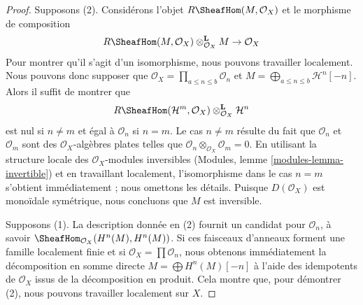 {\begin{proof}
Supposons (2). Considérons l'objet $R\SheafHom(M, \mathcal{O}_X)$
et le morphisme de composition
$$
R\SheafHom(M, \mathcal{O}_X) \otimes_{\mathcal{O}_X}^\mathbf{L} M \to
\mathcal{O}_X
$$
Pour montrer qu'il s'agit d'un isomorphisme, nous pouvons travailler localement. Nous pouvons donc supposer que $\mathcal{O}_X = \prod_{a \leq n \leq b} \mathcal{O}_n$
et $M = \bigoplus_{a \leq n \leq b} \mathcal{H}^n[-n]$. Alors il suffit de montrer que
$$
R\SheafHom(\mathcal{H}^m, \mathcal{O}_X)
\otimes_{\mathcal{O}_X}^\mathbf{L} \mathcal{H}^n
$$
est nul si $n \not = m$ et égal à $\mathcal{O}_n$ si $n = m$. Le cas $n \not = m$ résulte du fait que $\mathcal{O}_n$ et
$\mathcal{O}_m$ sont des $\mathcal{O}_X$-algèbres plates telles que
$\mathcal{O}_n \otimes_{\mathcal{O}_X} \mathcal{O}_m = 0$. En utilisant la structure locale des $\mathcal{O}_X$-modules inversibles (Modules, lemme \ref{modules-lemma-invertible}) et en travaillant localement, l'isomorphisme dans le cas $n = m$ s'obtient immédiatement ; nous omettons les détails. Puisque $D(\mathcal{O}_X)$ est monoïdale symétrique, nous concluons que $M$ est inversible.

\medskip\noindent
Supposons (1). La description donnée en (2) fournit un candidat pour $\mathcal{O}_n$, à savoir $\SheafHom_{\mathcal{O}_X}(H^n(M), H^n(M))$. Si ces faisceaux d'anneaux forment une famille localement finie et si $\mathcal{O}_X = \prod \mathcal{O}_n$, nous obtenons immédiatement la décomposition en somme directe $M = \bigoplus H^n(M)[-n]$ à l'aide des idempotents de $\mathcal{O}_X$ issus de la décomposition en produit. Cela montre que, pour démontrer (2), nous pouvons travailler localement sur $X$.

\medskip\noindent


\end{proof}}
